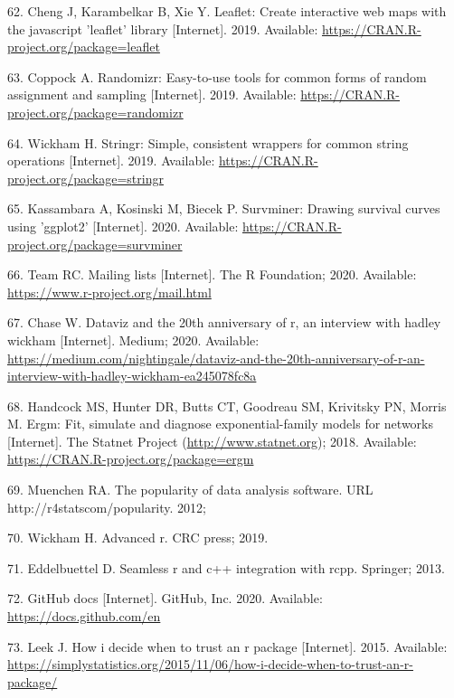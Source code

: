 \documentclass[10pt,letterpaper]{article}
\begin{document}
\leavevmode\hypertarget{ref-leaflet}{}%
62. Cheng J, Karambelkar B, Xie Y. Leaflet: Create interactive web maps
with the javascript 'leaflet' library {[}Internet{]}. 2019. Available:
\url{https://CRAN.R-project.org/package=leaflet}

\leavevmode\hypertarget{ref-randomizr}{}%
63. Coppock A. Randomizr: Easy-to-use tools for common forms of random
assignment and sampling {[}Internet{]}. 2019. Available:
\url{https://CRAN.R-project.org/package=randomizr}

\leavevmode\hypertarget{ref-stringr}{}%
64. Wickham H. Stringr: Simple, consistent wrappers for common string
operations {[}Internet{]}. 2019. Available:
\url{https://CRAN.R-project.org/package=stringr}

\leavevmode\hypertarget{ref-survminer}{}%
65. Kassambara A, Kosinski M, Biecek P. Survminer: Drawing survival
curves using 'ggplot2' {[}Internet{]}. 2020. Available:
\url{https://CRAN.R-project.org/package=survminer}

\leavevmode\hypertarget{ref-Rmail2020}{}%
66. Team RC. Mailing lists {[}Internet{]}. The R Foundation; 2020.
Available: \url{https://www.r-project.org/mail.html}

\leavevmode\hypertarget{ref-chase2020}{}%
67. Chase W. Dataviz and the 20th anniversary of r, an interview with
hadley wickham {[}Internet{]}. Medium; 2020. Available:
\url{https://medium.com/nightingale/dataviz-and-the-20th-anniversary-of-r-an-interview-with-hadley-wickham-ea245078fc8a}

\leavevmode\hypertarget{ref-statnet}{}%
68. Handcock MS, Hunter DR, Butts CT, Goodreau SM, Krivitsky PN, Morris
M. Ergm: Fit, simulate and diagnose exponential-family models for
networks {[}Internet{]}. The Statnet Project
(\url{http://www.statnet.org}); 2018. Available:
\url{https://CRAN.R-project.org/package=ergm}

\leavevmode\hypertarget{ref-muenchen2012}{}%
69. Muenchen RA. The popularity of data analysis software. URL
http://r4statscom/popularity. 2012;

\leavevmode\hypertarget{ref-wickham2019}{}%
70. Wickham H. Advanced r. CRC press; 2019.

\leavevmode\hypertarget{ref-eddelbuettel2013}{}%
71. Eddelbuettel D. Seamless r and c++ integration with rcpp. Springer;
2013.

\leavevmode\hypertarget{ref-githubdocs}{}%
72. GitHub docs {[}Internet{]}. GitHub, Inc. 2020. Available:
\url{https://docs.github.com/en}

\leavevmode\hypertarget{ref-leek2015}{}%
73. Leek J. How i decide when to trust an r package {[}Internet{]}.
2015. Available:
\url{https://simplystatistics.org/2015/11/06/how-i-decide-when-to-trust-an-r-package/}
\end{document}
